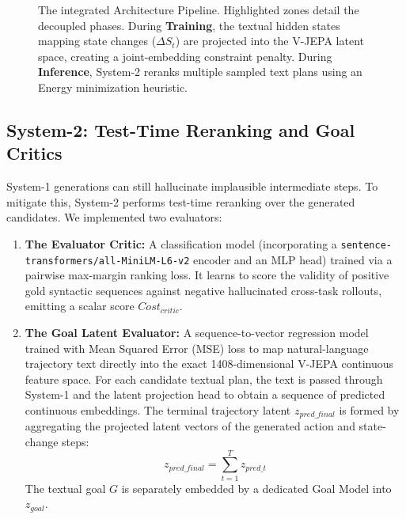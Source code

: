 \documentclass{article}
\begin{document}
\begin{figure}[t]
{
}
\caption{The integrated Architecture Pipeline. Highlighted zones detail the decoupled phases. During \textbf{Training}, the textual hidden states mapping state changes ($\Delta S_t$) are projected into the V-JEPA latent space, creating a joint-embedding constraint penalty. During \textbf{Inference}, System-2 reranks multiple sampled text plans using an Energy minimization heuristic.}
\label{fig:pipeline_arch}
\end{figure}

\subsection{System-2: Test-Time Reranking and Goal Critics}
System-1 generations can still hallucinate implausible intermediate steps. To mitigate this, System-2 performs test-time reranking over the generated candidates. We implemented two evaluators:
\begin{enumerate}
    \item \textbf{The Evaluator Critic:} A classification model (incorporating a \texttt{sentence-transformers/all-MiniLM-L6-v2} encoder and an MLP head) trained via a pairwise max-margin ranking loss. It learns to score the validity of positive gold syntactic sequences against negative hallucinated cross-task rollouts, emitting a scalar score $Cost_{critic}$.
    \item \textbf{The Goal Latent Evaluator:} A sequence-to-vector regression model trained with Mean Squared Error (MSE) loss to map natural-language trajectory text directly into the exact 1408-dimensional V-JEPA continuous feature space. For each candidate textual plan, the text is passed through System-1 and the latent projection head to obtain a sequence of predicted continuous embeddings. The terminal trajectory latent $z_{pred\_final}$ is formed by aggregating the projected latent vectors of the generated action and state-change steps:
    \begin{equation}
        z_{pred\_final} = \sum_{t=1}^T z_{pred\_t}
    \end{equation}
    The textual goal $G$ is separately embedded by a dedicated Goal Model into $z_{goal}$.
\end{enumerate}
\end{document}
